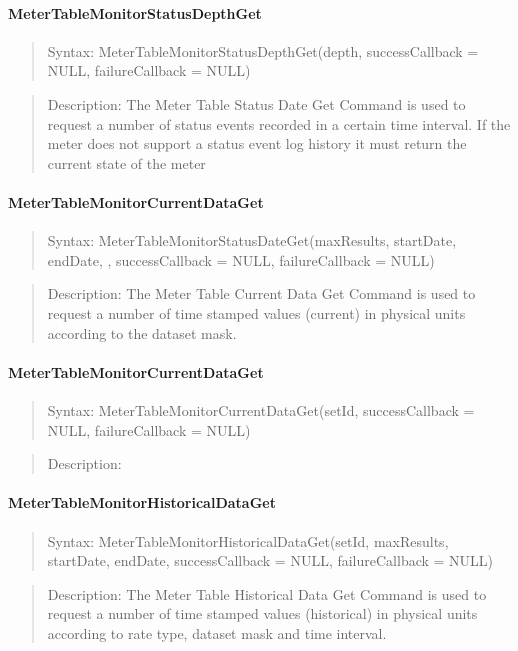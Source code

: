 \paragraph {MeterTableMonitorStatusDepthGet}
\begin{quote} Syntax: MeterTableMonitorStatusDepthGet(depth, successCallback = NULL, failureCallback = NULL)\end{quote} 
\begin{quote} Description: The Meter Table Status Date Get Command is used to request a 
number of status events recorded in a certain time interval. If the meter does not support 
a status event log history it must return the current state of the meter \end{quote}


\paragraph {MeterTableMonitorCurrentDataGet}
\begin{quote} Syntax: MeterTableMonitorStatusDateGet(maxResults, startDate, endDate, , successCallback = NULL, failureCallback = NULL)\end{quote}  
\begin{quote} Description:  The Meter Table Current Data Get Command is used to request a 
number of time stamped values (current) in physical units according to the dataset mask.
\end{quote}

\paragraph {MeterTableMonitorCurrentDataGet}
\begin{quote} Syntax: MeterTableMonitorCurrentDataGet(setId, successCallback = NULL, failureCallback = NULL)\end{quote} 
\begin{quote} Description:  \end{quote}

\paragraph {MeterTableMonitorHistoricalDataGet}
\begin{quote} Syntax: MeterTableMonitorHistoricalDataGet(setId, maxResults, startDate, 
endDate, successCallback = NULL, failureCallback = NULL)\end{quote} 
\begin{quote} Description: The Meter Table Historical Data Get Command is used to request 
a number of time stamped values (historical) in physical units according to rate type, 
dataset mask and time interval. \end{quote}


